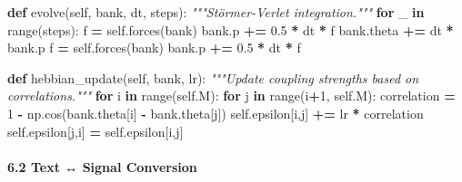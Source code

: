 \documentclass[
  11pt,
  a4paper,
]{article}
\newenvironment{Shaded}{\begin{snugshade}}{\end{snugshade}}
\newcommand{\BuiltInTok}[1]{#1}
\newcommand{\CommentTok}[1]{\textcolor[rgb]{0.56,0.35,0.01}{\textit{#1}}}
\newcommand{\ControlFlowTok}[1]{\textcolor[rgb]{0.13,0.29,0.53}{\textbf{#1}}}
\newcommand{\DecValTok}[1]{\textcolor[rgb]{0.00,0.00,0.81}{#1}}
\newcommand{\FloatTok}[1]{\textcolor[rgb]{0.00,0.00,0.81}{#1}}
\newcommand{\KeywordTok}[1]{\textcolor[rgb]{0.13,0.29,0.53}{\textbf{#1}}}
\newcommand{\NormalTok}[1]{#1}
\newcommand{\OperatorTok}[1]{\textcolor[rgb]{0.81,0.36,0.00}{\textbf{#1}}}
\newcommand{\VariableTok}[1]{\textcolor[rgb]{0.00,0.00,0.00}{#1}}
\begin{document}
\begin{Shaded}
\begin{Highlighting}[]
    \KeywordTok{def}\NormalTok{ evolve(}\VariableTok{self}\NormalTok{, bank, dt, steps):}
        \CommentTok{"""Störmer{-}Verlet integration."""}
        \ControlFlowTok{for}\NormalTok{ \_ }\KeywordTok{in} \BuiltInTok{range}\NormalTok{(steps):}
\NormalTok{            f }\OperatorTok{=} \VariableTok{self}\NormalTok{.forces(bank)}
\NormalTok{            bank.p }\OperatorTok{+=} \FloatTok{0.5} \OperatorTok{*}\NormalTok{ dt }\OperatorTok{*}\NormalTok{ f}
\NormalTok{            bank.theta }\OperatorTok{+=}\NormalTok{ dt }\OperatorTok{*}\NormalTok{ bank.p}
\NormalTok{            f }\OperatorTok{=} \VariableTok{self}\NormalTok{.forces(bank)}
\NormalTok{            bank.p }\OperatorTok{+=} \FloatTok{0.5} \OperatorTok{*}\NormalTok{ dt }\OperatorTok{*}\NormalTok{ f}
    
    \KeywordTok{def}\NormalTok{ hebbian\_update(}\VariableTok{self}\NormalTok{, bank, lr):}
        \CommentTok{"""Update coupling strengths based on correlations."""}
        \ControlFlowTok{for}\NormalTok{ i }\KeywordTok{in} \BuiltInTok{range}\NormalTok{(}\VariableTok{self}\NormalTok{.M):}
            \ControlFlowTok{for}\NormalTok{ j }\KeywordTok{in} \BuiltInTok{range}\NormalTok{(i}\OperatorTok{+}\DecValTok{1}\NormalTok{, }\VariableTok{self}\NormalTok{.M):}
\NormalTok{                correlation }\OperatorTok{=} \DecValTok{1} \OperatorTok{{-}}\NormalTok{ np.cos(bank.theta[i] }\OperatorTok{{-}}\NormalTok{ bank.theta[j])}
                \VariableTok{self}\NormalTok{.epsilon[i,j] }\OperatorTok{+=}\NormalTok{ lr }\OperatorTok{*}\NormalTok{ correlation}
                \VariableTok{self}\NormalTok{.epsilon[j,i] }\OperatorTok{=} \VariableTok{self}\NormalTok{.epsilon[i,j]}
\end{Highlighting}
\end{Shaded}

\paragraph{6.2 Text ↔ Signal Conversion}\label{text-signal-conversion}
\end{document}

